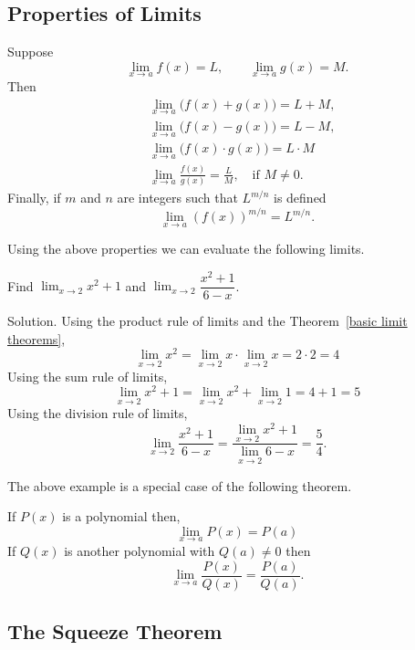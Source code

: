 \documentclass[../main.tex]{subfiles}
\begin{document}

\subsection*{Properties of Limits}
\begin{theorem}
  Suppose
  \[
  \lim_{x\to a}f(x)=L, \qquad \lim_{x\to a}g(x)=M.
  \]
  Then
  \begin{align}
    & \lim_{x\to a}\bigl(f(x)+g(x)\bigr)=L+M,  \\
    & \lim_{x\to a}\bigl(f(x)-g(x)\bigr)= L - M,  \\
    & \lim_{x\to a}\bigl(f(x)\cdot g(x)\bigr)= L\cdot M \\
    & \lim_{x\to a}\frac{f(x)}{g(x)}= \frac{L}{M}, \quad \text{if } M \neq 0.
  \end{align}
  Finally, if $m$ and $n$ are integers such that $L^{m/n}$ is defined
  \begin{equation}
    \lim_{x\to a}(f(x))^{m/n}= L^{m/n}.
  \end{equation}
\end{theorem}

Using the above properties we can evaluate the following limits.
\begin{example}
  Find $\lim_{x \to 2} x^2 +1$ and $\lim_{x \to 2} \dfrac{x^2+1}{6-x}$.

  Solution. Using the product rule of limits and the Theorem~\ref{basic limit theorems},
  \[
    \lim_{x \to 2} x^2 = \lim_{x \to 2} x \cdot \lim_{x \to 2} x = 2 \cdot 2 = 4
  \]
  Using the sum rule of limits,
  \[
    \lim_{x \to 2} x^2 + 1= \lim_{x \to 2} x^2 + \lim_{x \to 2} 1 = 4 + 1 = 5
  \]
  Using the division rule of limits,
  \[
    \lim_{x \to 2} \frac{x^2+1}{6-x} = \frac{\lim_{x \to 2} x^2+1}{\lim_{x \to 2} 6-x} = \frac{5}{4}.
  \]
\end{example}

The above example is a special case of the following theorem.
\begin{theorem}
  If $P(x)$ is a polynomial then,
  \[
    \lim_{x \to a} P(x) = P(a)
  \]
  If $Q(x)$ is another polynomial with $Q(a) \neq 0$ then
  \[
    \lim_{x \to a} \frac{P(x)}{Q(x)} = \frac{P(a)}{Q(a)}.
  \]
\end{theorem}

\subsection*{The Squeeze Theorem}
\end{document}
